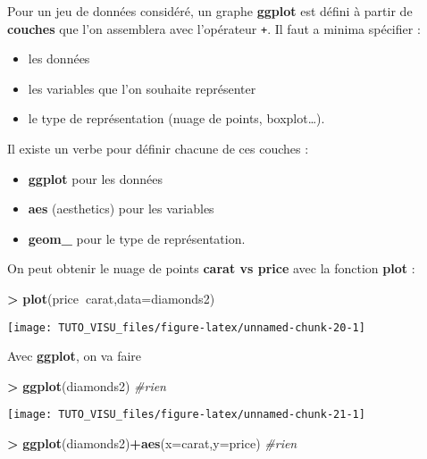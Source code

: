 \documentclass[]{book}
\newenvironment{Shaded}{\begin{snugshade}}{\end{snugshade}}
\newcommand{\CommentTok}[1]{\textcolor[rgb]{0.56,0.35,0.01}{\textit{#1}}}
\newcommand{\DataTypeTok}[1]{\textcolor[rgb]{0.13,0.29,0.53}{#1}}
\newcommand{\KeywordTok}[1]{\textcolor[rgb]{0.13,0.29,0.53}{\textbf{#1}}}
\newcommand{\NormalTok}[1]{#1}
\newcommand{\OperatorTok}[1]{\textcolor[rgb]{0.81,0.36,0.00}{\textbf{#1}}}
\newcommand{\StringTok}[1]{\textcolor[rgb]{0.31,0.60,0.02}{#1}}
\providecommand{\tightlist}{%
  \setlength{\itemsep}{0pt}\setlength{\parskip}{0pt}}
\theoremstyle{definition}
\theoremstyle{definition}
\theoremstyle{definition}
\theoremstyle{remark}
\begin{document}
Pour un jeu de données considéré, un graphe \textbf{ggplot} est défini à partir de \textbf{couches} que l'on assemblera avec l'opérateur \texttt{+}. Il faut a minima spécifier :

\begin{itemize}
\tightlist
\item
  les données
\item
  les variables que l'on souhaite représenter
\item
  le type de représentation (nuage de points, boxplot\ldots{}).
\end{itemize}

Il existe un verbe pour définir chacune de ces couches :

\begin{itemize}
\tightlist
\item
  \textbf{ggplot} pour les données
\item
  \textbf{aes} (aesthetics) pour les variables
\item
  \textbf{geom\_} pour le type de représentation.
\end{itemize}

On peut obtenir le nuage de points \textbf{carat vs price} avec la fonction \textbf{plot} :

\begin{Shaded}
\begin{Highlighting}[]
\OperatorTok{>}\StringTok{ }\KeywordTok{plot}\NormalTok{(price}\OperatorTok{~}\NormalTok{carat,}\DataTypeTok{data=}\NormalTok{diamonds2)}
\end{Highlighting}
\end{Shaded}

\begin{center}\texttt{[image: TUTO\_VISU\_files/figure-latex/unnamed-chunk-20-1]} \end{center}

Avec \textbf{ggplot}, on va faire

\begin{Shaded}
\begin{Highlighting}[]
\OperatorTok{>}\StringTok{ }\KeywordTok{ggplot}\NormalTok{(diamonds2) }\CommentTok{#rien}
\end{Highlighting}
\end{Shaded}

\begin{center}\texttt{[image: TUTO\_VISU\_files/figure-latex/unnamed-chunk-21-1]} \end{center}

\begin{Shaded}
\begin{Highlighting}[]
\OperatorTok{>}\StringTok{ }\KeywordTok{ggplot}\NormalTok{(diamonds2)}\OperatorTok{+}\KeywordTok{aes}\NormalTok{(}\DataTypeTok{x=}\NormalTok{carat,}\DataTypeTok{y=}\NormalTok{price) }\CommentTok{#rien}
\end{Highlighting}
\end{Shaded}
\end{document}
